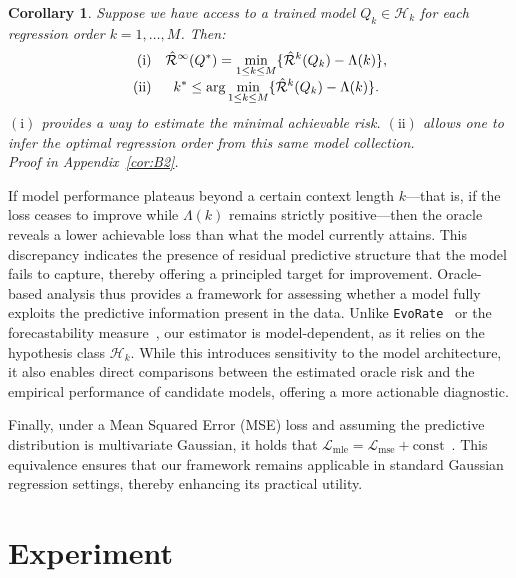 \documentclass{article}
\newtheorem{corollary}[theorem]{Corollary}
\begin{document}
\begin{corollary}\label{prop:oracle}
Suppose we have access to a trained model $Q_k \in \mathcal{H}_k$ for each regression order $k = 1, \dots, M$. Then:
\[
  \begin{array}{r@{\quad}c}
    (\mathrm{i}) & \displaystyle\hat{\mathcal{R}}^{\infty}(Q^{*})
      = \min_{1\le k\le M}\{\hat{\mathcal{R}}^{k}(Q_k) - \Lambda(k)\},\\[6pt]
    (\mathrm{ii}) & \displaystyle k^*
      \leq \arg\min_{1\le k\le M}\{\hat{\mathcal{R}}^{k}(Q_k) - \Lambda(k)\}.
  \end{array}
\]
$(\mathrm{i})$ provides a way to estimate the minimal achievable risk. $(\mathrm{ii})$ allows one to infer the optimal regression order from this same model collection.\\
\textit{Proof in Appendix~\ref{cor:B2}.}
\end{corollary}

If model performance plateaus beyond a certain context length \( k \)—that is, if the loss ceases to improve while \( \Lambda(k) \) remains strictly positive—then the oracle reveals a lower achievable loss than what the model currently attains. This discrepancy indicates the presence of residual predictive structure that the model fails to capture, thereby offering a principled target for improvement. Oracle-based analysis thus provides a framework for assessing whether a model fully exploits the predictive information present in the data. Unlike \texttt{EvoRate}~\cite{zeng2025towards} or the forecastability measure~\cite{goerg2013forecastable}, our estimator is model-dependent, as it relies on the hypothesis class \( \mathcal{H}_k \). While this introduces sensitivity to the model architecture, it also enables direct comparisons between the estimated oracle risk and the empirical performance of candidate models, offering a more actionable diagnostic.

Finally, under a Mean Squared Error (MSE) loss and assuming the predictive distribution is multivariate Gaussian, it holds that $\mathcal{L}_{\mathrm{mle}} = \mathcal{L}_{\mathrm{mse}} + \text{const}$~\cite{zeng2025towards}. This equivalence ensures that our framework remains applicable in standard Gaussian regression settings, thereby enhancing its practical utility.

\section{Experiment}
\label{sec:Experiment}
\end{document}

